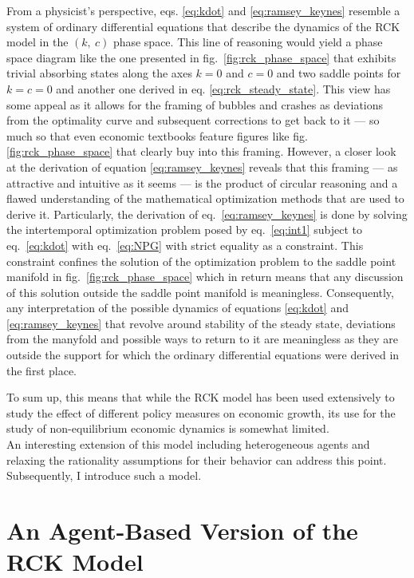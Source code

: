 From a physicist's perspective, eqs. \eqref{eq:kdot} and \eqref{eq:ramsey_keynes} resemble a system of ordinary differential equations that describe the dynamics of the RCK model in the $(k,~c)$ phase space. This line of reasoning would yield a phase space diagram like the one presented in fig.~\ref{fig:rck_phase_space} that exhibits trivial absorbing states along the axes $k=0$ and $c=0$ and two saddle points for $k=c=0$ and another one derived in eq. \eqref{eq:rck_steady_state}.
This view has some appeal as it allows for the framing of bubbles and crashes as deviations from the optimality curve and subsequent corrections to get back to it --- so much so that even economic textbooks feature figures like fig. \ref{fig:rck_phase_space} that clearly buy into this framing.
However, a closer look at the derivation of equation \eqref{eq:ramsey_keynes} reveals that this framing --- as attractive and intuitive as it seems --- is the product of circular reasoning and a flawed understanding of the mathematical optimization methods that are used to derive it. Particularly, the derivation of eq.~\eqref{eq:ramsey_keynes} is done by solving the intertemporal optimization problem posed by eq.~\eqref{eq:int1} subject to eq.~\eqref{eq:kdot} with eq.~\eqref{eq:NPG} with strict equality as a constraint. This constraint confines the solution of the optimization problem to the saddle point manifold in fig.~\ref{fig:rck_phase_space} which in return means that any discussion of this solution outside the saddle point manifold is meaningless. Consequently, any interpretation of the possible dynamics of equations \eqref{eq:kdot} and \eqref{eq:ramsey_keynes} that revolve around stability of the steady state, deviations from the manyfold and possible ways to return to it are meaningless as they are outside the support for which the ordinary differential equations were derived in the first place.

To sum up, this means that while the RCK model has been used extensively to study the effect of different policy measures on economic growth, its use for the study of non-equilibrium economic dynamics is somewhat limited. \\

An interesting extension of this model including heterogeneous agents and relaxing the rationality assumptions for their behavior can address this point. Subsequently, I introduce such a model.




\section{An Agent-Based Version of the RCK Model}
\label{sec:savings_model}
